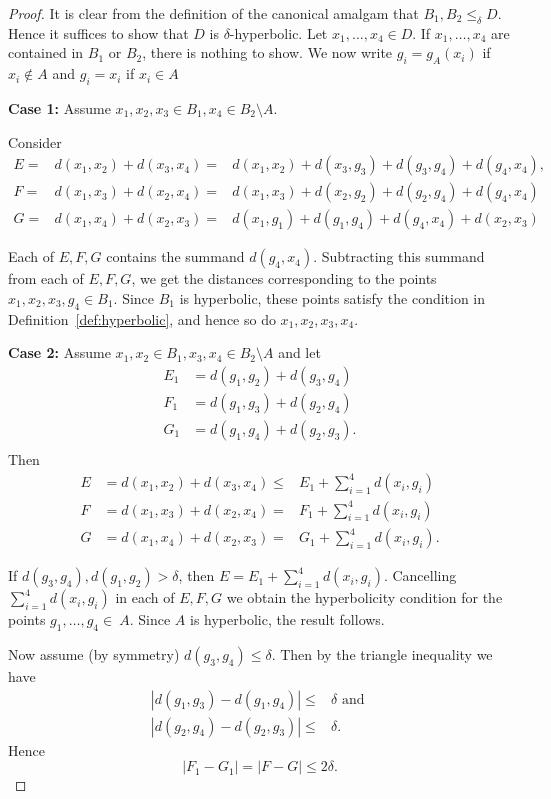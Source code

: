 \documentclass{amsart}
\renewcommand{\d}{\delta}
\begin{document}
\begin{proof}
It is clear from the definition of the canonical amalgam that $B_1, B_2\leq_\d D$. Hence it suffices to show that $D$ is $\d$-hyperbolic. 
 Let $x_1,\ldots, x_4\in D$. 
If $x_1,\ldots, x_4$ are contained in $B_1$ or $B_2$, there is nothing to show. 
We now write $g_i=g_A(x_i)$ if $x_i\notin A$ and $g_i=x_i$ if $x_i\in A$

\medskip\noindent
{\bf Case 1:} Assume $x_1,x_2,x_3\in B_1, x_4\in B_2\setminus A$.


Consider 
\begin{align*}
E=& d(x_1, x_2)+d(x_3,x_4)=&d(x_1,x_2)+d(x_3,g_3)+d(g_3,g_4)+d(g_4,x_4),\\
 F=& d(x_1, x_3)+d(x_2,x_4)=&d(x_1, x_3)+d(x_2,g_2)+d(g_2,g_4)+d(g_4,x_4)\\
 G=& d(x_1, x_4)+d(x_2,x_3)=&d(x_1,g_1)+d(g_1,g_4)+d(g_4, x_4)+d(x_2,x_3)
\end{align*}

Each of $E, F, G$ contains the summand $d(g_4,x_4)$. Subtracting this summand from each of $E, F, G$, we get the distances corresponding to the points $x_1,x_2,x_3,g_4\in B_1$. Since $B_1$ is hyperbolic, these points satisfy the condition in Definition~\ref{def:hyperbolic}, and hence so do $x_1,x_2,x_3, x_4$.

\medskip\noindent
{\bf Case 2:} Assume $x_1,x_2\in B_1, x_3,x_4\in B_2\setminus A$
 and let
\begin{align*}
E_1&=d(g_1,g_2)+d(g_3,g_4)\\
F_1&=d(g_1,g_3)+d(g_2,g_4)\\
G_1&=d(g_1,g_4)+d(g_2,g_3).\\
\end{align*}
Then
\begin{align*}
E&=d(x_1, x_2)+d(x_3,x_4)\leq & E_1+\sum_{i=1}^4 d(x_i,g_i) \\
 F&=d(x_1, x_3)+d(x_2,x_4)= & F_1+\sum_{i=1}^4 d(x_i,g_i) \\
 G&=d(x_1, x_4)+d(x_2,x_3)= & G_1+\sum_{i=1}^4 d(x_i,g_i).
\end{align*}




If  $d(g_3, g_4), d(g_1,g_2)>\d$, then $E=E_1+\sum_{i=1}^4 d(x_i,g_i)$. Cancelling $\sum_{i=1}^4 d(x_i,g_i)$  in each of $E,F, G$ we obtain the hyperbolicity condition for the points $g_1,\ldots, g_4\in~A$. Since $A$ is hyperbolic, the result follows.

Now assume (by symmetry) $d(g_3,g_4)\leq \d$. Then by the triangle inequality we have
\begin{align*}
|d(g_1,g_3)-d(g_1,g_4)|\leq& \d \mbox{  and } \\
|d(g_2,g_4)-d(g_2,g_3)|\leq &\d.
\end{align*}
 Hence
\begin{equation}\label{eq: amalgam}
|F_1-G_1|=|F-G|\leq 2\d.
\end{equation}


\end{proof}
\end{document}
